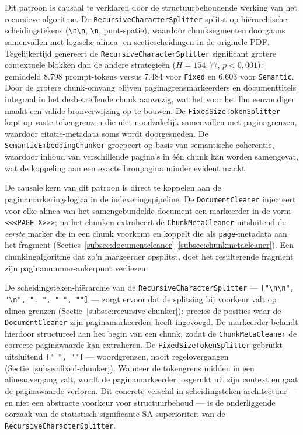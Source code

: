 Dit patroon is causaal te verklaren door de structuurbehoudende werking van het recursieve algoritme. De \texttt{RecursiveCharacterSplitter} splitst op hiërarchische scheidingstekens (\texttt{\textbackslash n\textbackslash n}, \texttt{\textbackslash n}, punt-spatie), waardoor chunksegmenten doorgaans samenvallen met logische alinea- en sectiescheidingen in de originele PDF. Tegelijkertijd genereert de \texttt{RecursiveCharacterSplitter} significant grotere contextuele blokken dan de andere strategieën ($H = 154{,}77$, $p < 0{,}001$): gemiddeld $8.798$ prompt-tokens versus $7.484$ voor \texttt{Fixed} en $6.603$ voor \texttt{Semantic}. Door de grotere chunk-omvang blijven paginagrensmarkeerders en documenttitels integraal in het desbetreffende chunk aanwezig, wat het voor het \gls{llm} eenvoudiger maakt een valide bronverwijzing op te bouwen. De \texttt{FixedSizeTokenSplitter} kapt op vaste tokengrenzen die niet noodzakelijk samenvallen met paginagrenzen, waardoor citatie-metadata soms wordt doorgesneden. De \texttt{SemanticEmbeddingChunker} groepeert op basis van semantische coherentie, waardoor inhoud van verschillende pagina's in één chunk kan worden samengevat, wat de koppeling aan een exacte bronpagina minder evident maakt.

De causale kern van dit patroon is direct te koppelen aan de paginamarkeringslogica in de indexeringspipeline. De \texttt{DocumentCleaner} injecteert voor elke alinea van het samengebundelde document een markeerder in de vorm \texttt{<<<PAGE X>>>}; na het chunken extraheert de \texttt{ChunkMetaCleaner} uitsluitend de \textit{eerste} marker die in een chunk voorkomt en koppelt die als \texttt{page}-metadata aan het fragment (Secties~\ref{subsec:documentcleaner}--\ref{subsec:chunkmetacleaner}). Een chunkingalgoritme dat zo'n markeerder opsplitst, doet het resulterende fragment zijn paginanummer-ankerpunt verliezen.

De scheidingsteken-hiërarchie van de \texttt{RecursiveCharacterSplitter} — \texttt{["\textbackslash n\textbackslash n", "\textbackslash n", ". ", " ", ""]} — zorgt ervoor dat de splitsing bij voorkeur valt op alinea-grenzen (Sectie~\ref{subsec:recursive-chunker}): precies de posities waar de \texttt{DocumentCleaner} zijn paginamarkeerders heeft ingevoegd. De markeerder belandt hierdoor structureel aan het begin van een chunk, zodat de \texttt{ChunkMetaCleaner} de correcte paginawaarde kan extraheren. De \texttt{FixedSizeTokenSplitter} gebruikt uitsluitend \texttt{[" ", ""]} — woordgrenzen, nooit regelovergangen (Sectie~\ref{subsec:fixed-chunker}). Wanneer de tokengrens midden in een alineaovergang valt, wordt de paginamarkeerder losgerukt uit zijn context en gaat de paginawaarde verloren. Dit concrete verschil in scheidingsteken-architectuur — en niet een abstracte voorkeur voor structuurbehoud — is de onderliggende oorzaak van de statistisch significante SA-superioriteit van de \texttt{RecursiveCharacterSplitter}.

